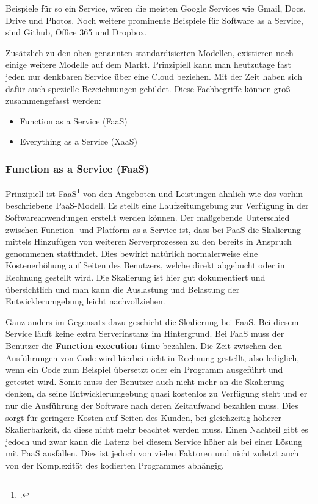 Beispiele für so ein Service, wären die meisten Google Services wie Gmail, Docs, Drive und Photos. Noch weitere prominente Beispiele für Software as a Service, sind Github, Office 365 und Dropbox.

Zusätzlich zu den oben genannten standardisierten Modellen, existieren noch einige weitere Modelle auf dem Markt. Prinzipiell
kann man heutzutage fast jeden nur denkbaren Service über eine Cloud beziehen. Mit der Zeit haben sich dafür auch spezielle Bezeichnungen gebildet. Diese Fachbegriffe können groß zusammengefasst werden:
\begin{itemize}
	\item Function as a Service (FaaS)
	\item Everything as a Service (XaaS)
\end{itemize}

\subsubsection{Function as a Service (FaaS)}
Prinzipiell ist FaaS\footcite{cloud-ms} von den Angeboten und Leistungen ähnlich wie das vorhin beschriebene PaaS-Modell. Es stellt eine Laufzeitumgebung zur Verfügung in der Softwareanwendungen erstellt werden können.
Der maßgebende Unterschied zwischen Function- und Platform as a Service ist, dass bei PaaS die Skalierung mittels Hinzufügen von weiteren Serverprozessen zu den bereits in Anspruch genommenen stattfindet.
Dies bewirkt natürlich normalerweise eine Kostenerhöhung auf Seiten des Benutzers, welche direkt abgebucht oder in Rechnung gestellt wird.
Die Skalierung ist hier gut dokumentiert und übersichtlich und man kann die Auslastung und Belastung der Entwicklerumgebung leicht nachvollziehen.

Ganz anders im Gegensatz dazu geschieht die Skalierung bei FaaS. Bei diesem Service läuft keine extra Serverinstanz im Hintergrund. Bei FaaS muss der Benutzer die \textbf{Function execution time} bezahlen. Die Zeit zwischen den Ausführungen von Code wird hierbei nicht in Rechnung gestellt, also lediglich, wenn ein Code zum Beispiel übersetzt oder ein Programm ausgeführt und getestet wird. Somit muss der Benutzer auch nicht mehr an die Skalierung denken, da seine Entwicklerumgebung quasi kostenlos zu Verfügung steht und er nur die Ausführung der Software nach deren Zeitaufwand bezahlen muss.
Dies sorgt für geringere Kosten auf Seiten des Kunden, bei gleichzeitig höherer Skalierbarkeit, da diese nicht mehr beachtet werden muss.
Einen Nachteil gibt es jedoch und zwar kann die Latenz bei diesem Service höher als bei einer Lösung mit PaaS ausfallen.
Dies ist jedoch von vielen Faktoren und nicht zuletzt auch von der Komplexität des kodierten Programmes abhängig.

